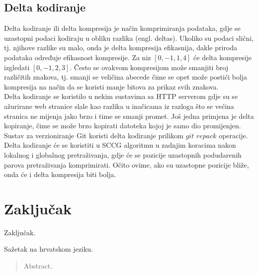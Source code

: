 \documentclass[times, utf8, diplomski]{fer}
\begin{document}
\section{Delta kodiranje}
Delta kodiranje ili delta kompresija je način komprimiranja podataka, gdje se uzastopni podaci kodiraju u obliku razlika (engl. deltas). Ukoliko su podaci slični, tj. njihove razlike su malo, onda je delta kompresija efikasnija, dakle priroda podataka određuje efikasnost kompresije. Za niz $[0, -1, 1, 4]$ će delta kompresije izgledati $[0, -1, 2, 3]$. Često se ovakvom kompresijom može smanjiti broj različitih znakova, tj. smanji se veličina abecede čime se opet može postići bolja kompresija na način da se koristi manje bitova za prikaz svih znakova.\\
Delta kodiranje se koristilo u nekim sustavima sa HTTP serverom gdje su se ažurirane web stranice slale kao razlika u inačicama iz razloga što se većina stranica ne mijenja jako brzo i time se smanji promet. Još jedna primjena je delta kopiranje, čime se može brzo kopirati datoteka kojoj je samo dio promijenjen. Sustav za verzioniranje Git koristi delta kodiranje prilikom $\textit{git repack}$ operacije.\\
Delta kodiranje će se koristiti u SCCG algoritmu u zadnjim koracima nakon lokalnog i globalnog pretraživanja, gdje će se pozicije uzastopnih podudarenih parova pretraživanja komprimirati. Očito ovime, ako su uzastopne pozicije bliže, onda će i delta kompresija biti bolja.

\chapter{Zaključak}
Zaključak.

\nocite{*}



\begin{sazetak}
Sažetak na hrvatskom jeziku.

\end{sazetak}

\begin{abstract}
Abstract.

\end{abstract}
\end{document}

